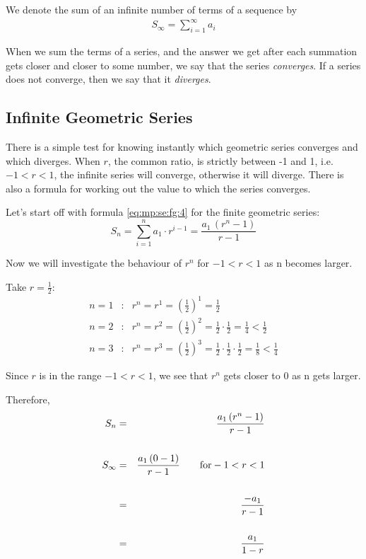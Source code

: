 We denote the sum of an infinite number of terms of a sequence by
\begin{eqnarray*}
S_\infty = \sum^\infty_{i=1} a_i
\end{eqnarray*}

When we sum the terms of a series, and the answer we get after each summation gets closer and closer to some number, we say that the series \textit{converges}. If a series does not converge, then we say that it \textit{diverges}.

\subsection{Infinite Geometric Series}

There is a simple test for knowing instantly which geometric series converges and which diverges. When $r$, the common ratio, is strictly between -1 and 1, i.e. $-1 < r < 1$, the infinite series will converge, otherwise it will diverge. There is also a formula for working out the value to which the series converges.

Let's start off with formula \eqref{eq:mp:se:fg:4} for the finite geometric series:
\begin{equation*}
S_n = \sum_{i=1}^n a_1 \cdot r^{i-1} = \frac{a_1 \, (r^n - 1)}{r-1}
\end{equation*}

Now we will investigate the behaviour of $r^n$ for $-1<r<1$ as n becomes larger.

Take $r=\frac{1}{2}$:
\begin{eqnarray*}
n=1 &:& r^n = r^1 =(\tfrac{1}{2})^1 = \tfrac{1}{2} \\
n=2 &:& r^n = r^2 =(\tfrac{1}{2})^2 = \tfrac{1}{2} \cdot \tfrac{1}{2} = \tfrac{1}{4} < \tfrac{1}{2} \\
n=3 &:& r^n = r^3 =(\tfrac{1}{2})^3 = \tfrac{1}{2} \cdot \tfrac{1}{2} \cdot \tfrac{1}{2} = \tfrac{1}{8} < \tfrac{1}{4}
\end{eqnarray*}

Since $r$ is in the range $-1<r<1$, we see that $r^n$ gets closer to $0$ as n gets larger.

Therefore,
\begin{eqnarray*}
S_n &=& \frac{a_1 \, (r^n - 1)}{r - 1} \\
\vspace{12pt} \\
S_\infty &=& \frac{a_1 \, (0 - 1)}{r - 1} \qquad \mathrm{ for } -1 < r < 1 \\
\vspace{12pt} \\
&=& \frac {-a_1}{r - 1} \\
\vspace{12pt} \\
&=& \frac {a_1}{1 - r}
\end{eqnarray*}

